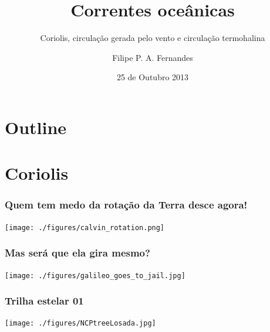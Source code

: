 \title[Aula 09]{Correntes oceânicas}
\subtitle{Coriolis, circulação gerada pelo vento e circulação termohalina}
\author[Filipe Fernandes]{Filipe P. A. Fernandes}
\date[Outubro 2013]{25 de Outubro 2013}




\begin{frame}[plain]
  \titlepage
\end{frame}

\section*{Outline}
\begin{frame}
\tableofcontents
\end{frame}

\section{Coriolis}
\begin{frame}
  \frametitle{Quem tem medo da rotação da Terra desce agora!}
  \begin{center}
    \texttt{[image: ./figures/calvin\_rotation.png]}
  \end{center}
\end{frame}


\begin{frame}
  \frametitle{Mas será que ela gira mesmo?}
  \begin{center}
    \texttt{[image: ./figures/galileo\_goes\_to\_jail.jpg]}
  \end{center}
\end{frame}


\begin{frame}
  \frametitle{Trilha estelar 01}
  \begin{center}
    \texttt{[image: ./figures/NCPtreeLosada.jpg]}
  \end{center}
\end{frame}



